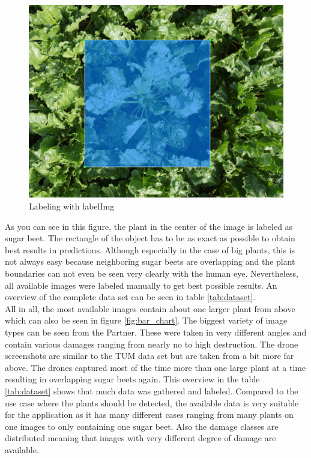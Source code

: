 \begin{figure}[htb!]
	\centering
	\includegraphics[scale=0.2]{figures/labeling.png}
	\caption{Labeling with labelImg}
	\label{fig:labeling}
\end{figure}

As you can see in this figure, the plant in the center of the image is labeled as sugar beet. The rectangle of the object has to be as exact as possible to obtain best results in predictions. Although especially in the case of big plants, this is not always easy because neighboring sugar beets are overlapping and the plant boundaries can not even be seen very clearly with the human eye. Nevertheless, all available images were labeled manually to get best possible results. An overview of the complete data set can be seen in table \ref{tab:dataset}.\\

All in all, the most available images contain about one larger plant from above which can also be seen in figure \ref{fig:bar_chart}. The biggest variety of image types can be seen from the Partner. These were taken in very different angles and contain various damages ranging from nearly no to high destruction. The drone screenshots are similar to the TUM data set but are taken from a bit more far above. The drones captured most of the time more than one large plant at a time resulting in overlapping sugar beets again. This overview in the table \ref{tab:dataset} shows that much data was gathered and labeled. Compared to the use case where the plants should be detected, the available data is very suitable for the application as it has many different cases ranging from many plants on one images to only containing one sugar beet. Also the damage classes are distributed meaning that images with very different degree of damage are available.

